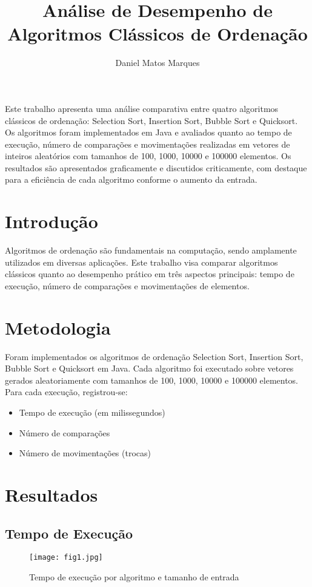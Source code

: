 \documentclass[12pt]{article}
\title{Análise de Desempenho de Algoritmos Clássicos de Ordenação}
\author{Daniel Matos Marques}
\begin{document}
 

\maketitle

\begin{resumo}
Este trabalho apresenta uma análise comparativa entre quatro algoritmos clássicos de ordenação: Selection Sort, Insertion Sort, Bubble Sort e Quicksort. Os algoritmos foram implementados em Java e avaliados quanto ao tempo de execução, número de comparações e movimentações realizadas em vetores de inteiros aleatórios com tamanhos de 100, 1000, 10000 e 100000 elementos. Os resultados são apresentados graficamente e discutidos criticamente, com destaque para a eficiência de cada algoritmo conforme o aumento da entrada.
\end{resumo}

\section{Introdução}

Algoritmos de ordenação são fundamentais na computação, sendo amplamente utilizados em diversas aplicações. Este trabalho visa comparar algoritmos clássicos quanto ao desempenho prático em três aspectos principais: tempo de execução, número de comparações e movimentações de elementos.

\section{Metodologia}

Foram implementados os algoritmos de ordenação Selection Sort, Insertion Sort, Bubble Sort e Quicksort em Java. Cada algoritmo foi executado sobre vetores gerados aleatoriamente com tamanhos de 100, 1000, 10000 e 100000 elementos. Para cada execução, registrou-se:
\begin{itemize}
  \item Tempo de execução (em milissegundos)
  \item Número de comparações
  \item Número de movimentações (trocas)
\end{itemize}

\section{Resultados}

\subsection{Tempo de Execução}
\begin{figure}[H]
\centering
\texttt{[image: fig1.jpg]}
\caption{Tempo de execução por algoritmo e tamanho de entrada}
\end{figure}
\end{document}
